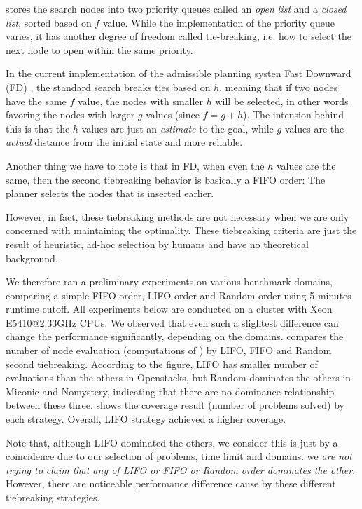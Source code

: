 \astar stores the search nodes into two priority queues called an \emph{open list} and a \emph{closed list}, sorted based on $f$ value. While the implementation of the priority queue varies, it has another degree of freedom called tie-breaking, i.e. how to select the next node to open within the same priority.

In the current implementation of the \sota admissible planning systen Fast Downward (FD) \cite{Helmert2006}, the standard \astar search breaks ties based on $h$, meaning that if two nodes have the same $f$ value, the nodes with smaller $h$ will be selected, in other words favoring the nodes with larger $g$ values (since $f=g+h$). The intension behind this is that the $h$ values are just an \emph{estimate} to the goal, while $g$ values are the \emph{actual} distance from the initial state and more reliable.

Another thing we have to note is that in FD, when even the $h$ values are the same, then the second tiebreaking behavior is basically a FIFO order: The planner selects the nodes that is inserted earlier. 

However, in fact, these tiebreaking methods are not necessary when we are only concerned with  maintaining the optimality. These tiebreaking criteria are just the result of heuristic, ad-hoc selection by humans and have no theoretical background.

We therefore ran a preliminary experiments on various benchmark domains, comparing a simple FIFO-order, LIFO-order and Random order using 5 minutes runtime cutoff. 
All experiments below are conducted on a cluster with Xeon E5410@2.33GHz CPUs.
We observed that even such a slightest difference can change the performance significantly, depending on the domains.
 compares the number of node evaluation (computations of \lmcut)
by LIFO, FIFO and Random second tiebreaking.
According to the figure, LIFO has smaller number of evaluations than the others in Openstacks, but Random dominates the others in Miconic and Nomystery, indicating that there are no dominance relationship between these three.
 shows the coverage result (number of problems solved) by each strategy.
Overall, LIFO strategy achieved a higher coverage.

Note that, although LIFO dominated the others, we consider this is just by a coincidence due to our selection of problems, time limit and domains. we \emph{are not trying to claim that any of LIFO or FIFO or Random order dominates the other}. However, there are noticeable performance difference cause by these different tiebreaking strategies.

